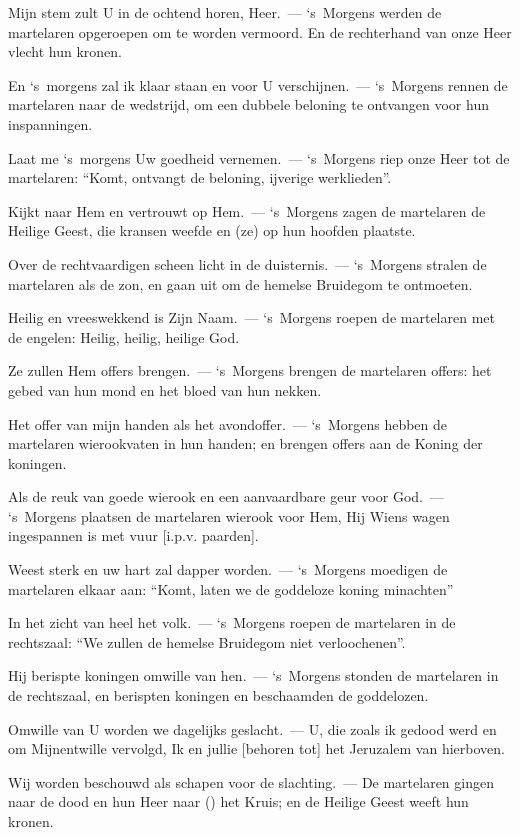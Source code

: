 \documentclass[12pt,twoside,a5paper]{article}
\begin{document}
\begin{halfparskip}
   Mijn stem zult U in de ochtend horen, Heer.~--- `s~Morgens werden de martelaren opgeroepen om te worden vermoord. En de rechterhand van onze Heer vlecht hun kronen.

  En `s~morgens zal ik klaar staan en voor U verschijnen.~--- `s~Morgens rennen de martelaren naar de wedstrijd, om een dubbele beloning te ontvangen voor hun inspanningen.

  Laat me `s~morgens Uw goedheid vernemen.~--- `s~Morgens riep onze Heer tot de martelaren: ``Komt, ontvangt de beloning, ijverige werklieden''.

  Kijkt naar Hem en vertrouwt op Hem.~--- `s~Morgens zagen de martelaren de Heilige Geest, die kransen weefde en (ze) op hun hoofden plaatste.

  Over de rechtvaardigen scheen licht in de duisternis.~--- `s~Morgens stralen de martelaren als de zon, en gaan uit om de hemelse Bruidegom te ontmoeten.

  Heilig en vreeswekkend is Zijn Naam.~--- `s~Morgens roepen de martelaren met de engelen: Heilig, heilig, heilige God.

  Ze zullen Hem offers brengen.~--- `s~Morgens brengen de martelaren offers: het gebed van hun mond en het bloed van hun nekken.

  Het offer van mijn handen als het avondoffer.~--- `s~Morgens hebben de martelaren wierookvaten in hun handen; en brengen offers aan de Koning der koningen.

  Als de reuk van goede wierook en een aanvaardbare geur voor God.~--- `s~Morgens plaatsen de martelaren wierook voor Hem, Hij Wiens wagen ingespannen is met vuur [i.p.v. paarden].

  Weest sterk en uw hart zal dapper worden.~--- `s~Morgens moedigen de martelaren elkaar aan: ``Komt, laten we de goddeloze koning minachten''

  In het zicht van heel het volk.~--- `s~Morgens roepen de martelaren in de rechtszaal: ``We zullen de hemelse Bruidegom niet verloochenen''.

  Hij berispte koningen omwille van hen.~--- `s~Morgens stonden de martelaren in de rechtszaal, en berispten koningen en beschaamden de goddelozen.

  Omwille van U worden we dagelijks geslacht.~--- U, die zoals ik gedood werd en om Mijnentwille vervolgd, Ik en jullie [behoren tot] het Jeruzalem van hierboven.

  Wij worden beschouwd als schapen voor de slachting.~--- De martelaren gingen naar  de dood en hun Heer naar () het Kruis; en de Heilige Geest weeft hun kronen.


\end{halfparskip}
\end{document}
